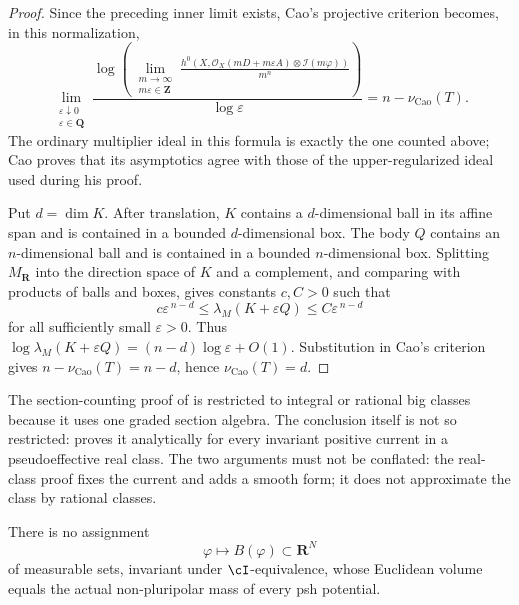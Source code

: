 \begin{proof}
Since the preceding inner limit exists, Cao's projective criterion
\cite[Proposition~4.4]{Cao14} becomes, in this normalization,
\[
 \lim_{\substack{\varepsilon\downarrow0\\
                  \varepsilon\in\mathbf Q}}
 \frac{\log\!\left(
   \displaystyle\lim_{\substack{m\to\infty\\m\varepsilon\in\mathbf Z}}
   \frac{h^0\!\left(X,\mathcal O_X(mD+m\varepsilon A)
                    \otimes\mathcal I(m\varphi)\right)}{m^n}
   \right)}{\log\varepsilon}
 =n-\nu_{\mathrm{Cao}}(T).
\]
The ordinary multiplier ideal in this formula is exactly the one counted
above; Cao proves that its asymptotics agree with those of the
upper-regularized ideal used during his proof.

Put $d=\dim K$.
After translation, $K$ contains a $d$-dimensional ball in its affine
span and is contained in a bounded $d$-dimensional box.  The body $Q$
contains an $n$-dimensional ball and is contained in a bounded
$n$-dimensional box.  Splitting $M_{\mathbf R}$ into the direction space
of $K$ and a complement, and comparing with products of balls and boxes,
gives constants $c,C>0$ such that
\[
 c\varepsilon^{\,n-d}
 \leq\lambda_M(K+\varepsilon Q)
 \leq C\varepsilon^{\,n-d}
\tag{55.61}\label{eq:ok-toric-tube-growth}
\]
for all sufficiently small $\varepsilon>0$.
Thus
$\log\lambda_M(K+\varepsilon Q)
 =(n-d)\log\varepsilon+O(1)$.  Substitution in Cao's criterion gives
$n-\nu_{\mathrm{Cao}}(T)=n-d$, hence
$\nu_{\mathrm{Cao}}(T)=d$.
\end{proof}

\begin{remark}
\label{rem:ok-toric-scope}
The section-counting proof of  is restricted to
integral or rational big classes because it uses one graded section algebra.
The conclusion itself is not so restricted:
 proves it analytically for every invariant
positive current in a pseudoeffective real class.  The two arguments must not
be conflated: the real-class proof fixes the current and adds a smooth form;
it does not approximate the class by rational classes.
\end{remark}

\begin{proposition}\label{prop:ok-i-invariant-obstruction}
There is no assignment
\[
              \varphi\longmapsto B(\varphi)\subset\mathbf R^N
\]
of measurable sets, invariant under $\cI$-equivalence, whose Euclidean
volume equals the actual non-pluripolar mass of every psh potential.
\end{proposition}

